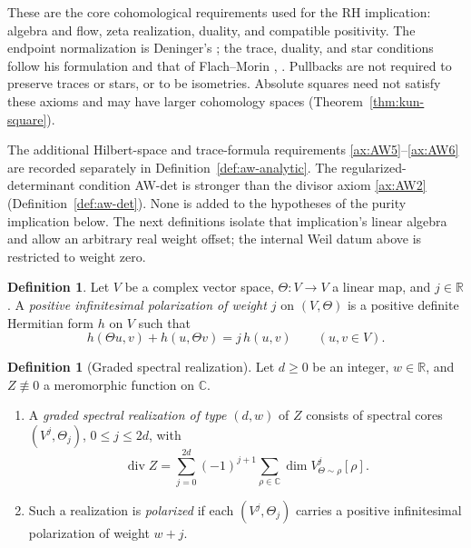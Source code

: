 \documentclass[11pt]{amsart}
\theoremstyle{plain}
\theoremstyle{definition}
\newtheorem{definition}[theorem]{Definition}
\theoremstyle{remark}
\numberwithin{equation}{section}
\newcommand{\C}{\mathbb{C}}
\newcommand{\R}{\mathbb{R}}
\DeclareMathOperator{\divisor}{div}
\begin{document}
These are the core cohomological requirements used for the RH
implication: algebra and flow, zeta realization, duality, and compatible
positivity. The endpoint normalization is Deninger's
\cite[(3), p.~168]{Deninger1998Analogies}; the trace, duality, and star
conditions follow his formulation and that of Flach--Morin
\cite[pp.~4--5]{Deninger2010HilbertPolya},
\cite[Conjecture~2.3(iii)--(iv), p.~522]
{FlachMorin2020DeningerWeilArakelov}.
Pullbacks are not required to preserve traces or stars, or to be
isometries. Absolute squares need not satisfy these axioms and may have
larger cohomology spaces (Theorem~\ref{thm:kun-square}).

The additional Hilbert-space and trace-formula requirements
\ref{ax:AW5}--\ref{ax:AW6} are recorded separately in
Definition~\ref{def:aw-analytic}. The regularized-determinant condition
AW-det is stronger than the divisor axiom \ref{ax:AW2}
(Definition~\ref{def:aw-det}). None is added to the hypotheses of the
purity implication below. The next definitions isolate that
implication's linear algebra and allow an arbitrary real weight offset;
the internal Weil datum above is restricted to weight zero.

\begin{definition}\label{def:inf-pol}
Let $V$ be a complex vector space, $\Theta:V\to V$ a linear map, and
$j\in\R$. A \emph{positive infinitesimal polarization of weight $j$} on
$(V,\Theta)$ is a positive definite Hermitian form $h$ on $V$ such that
\begin{equation}\label{eq:inf-pol}
h(\Theta u,v)+h(u,\Theta v)=j\,h(u,v)\qquad(u,v\in V).
\end{equation}
\end{definition}


\begin{definition}[Graded spectral realization]
\label{def:graded-realization}
Let $d\ge0$ be an integer, $w\in\R$, and $Z\not\equiv0$ a meromorphic
function on $\C$.
\begin{enumerate}[label=(\alph*)]
\item A \emph{graded spectral realization of type $(d,w)$}
of $Z$ consists of spectral cores $(V^j,\Theta_j)$, $0\le j\le2d$,
with
\[
 \divisor Z=\sum_{j=0}^{2d}(-1)^{j+1}
       \sum_{\rho\in\C}\dim V^j_{\Theta\sim\rho}[\rho].
\]
\item Such a realization is \emph{polarized} if each
$(V^j,\Theta_j)$ carries a positive
infinitesimal polarization of weight $w+j$.
\end{enumerate}
\end{definition}
\end{document}
